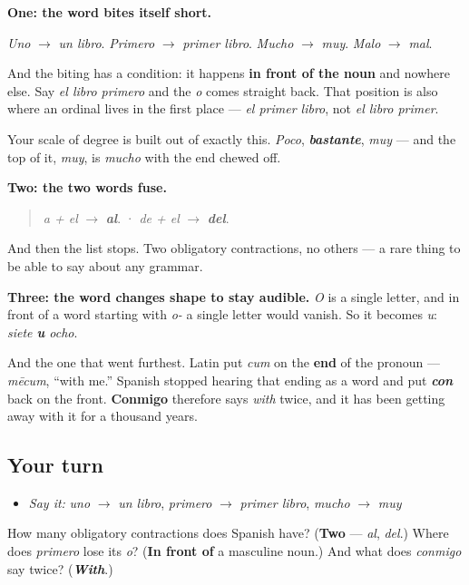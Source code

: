 \begin{grammarlens}[title={What you've built}]
\textbf{One: the word bites itself short.}

\emph{Uno} $\to$ \emph{un libro}. \emph{Primero} $\to$ \emph{primer libro}. \emph{Mucho} $\to$ \emph{muy}. \emph{Malo} $\to$ \emph{mal}.

And the biting has a condition: it happens \textbf{in front of the noun} and nowhere else. Say \emph{el libro primero} and the \emph{o} comes straight back. That position is also where an ordinal lives in the first place — \emph{el primer libro}, not \emph{el libro primer}.

Your scale of degree is built out of exactly this. \emph{Poco}, \emph{\textbf{bastante}}, \emph{muy} — and the top of it, \emph{muy}, is \emph{mucho} with the end chewed off.
\end{grammarlens}

\begin{culture}
\textbf{Two: the two words fuse.}

\begin{quote}
\emph{a + el} $\to$ \emph{\textbf{al}}.  ·  \emph{de + el} $\to$ \emph{\textbf{del}}.
\end{quote}

And then the list stops. Two obligatory contractions, no others — a rare thing to be able to say about any grammar.

\textbf{Three: the word changes shape to stay audible.} \emph{O} is a single letter, and in front of a word starting with \emph{o-} a single letter would vanish. So it becomes \emph{u}: \emph{siete \textbf{u} ocho}.

And the one that went furthest. Latin put \emph{cum} on the \textbf{end} of the pronoun — \emph{mēcum}, \textquotedblleft{}with me.\textquotedblright{} Spanish stopped hearing that ending as a word and put \emph{\textbf{con}} back on the front. \textbf{Conmigo} therefore says \emph{with} twice, and it has been getting away with it for a thousand years.
\end{culture}

\subsection*{Your turn}
\begin{itemize}
\raggedright
  \item \emph{Say it:} \emph{uno} $\to$ \emph{un libro}, \emph{primero} $\to$ \emph{primer libro}, \emph{mucho} $\to$ \emph{muy}
\end{itemize}

\begin{tcolorbox}[breakable,colback=teal!4,colframe=teal!35!black,title={Before you move on}]
How many obligatory contractions does Spanish have? (\textbf{Two} — \emph{al}, \emph{del}.) Where does \emph{primero} lose its \emph{o}? (\textbf{In front of} a masculine noun.) And what does \emph{conmigo} say twice? (\emph{\textbf{With}}.)
\end{tcolorbox}

